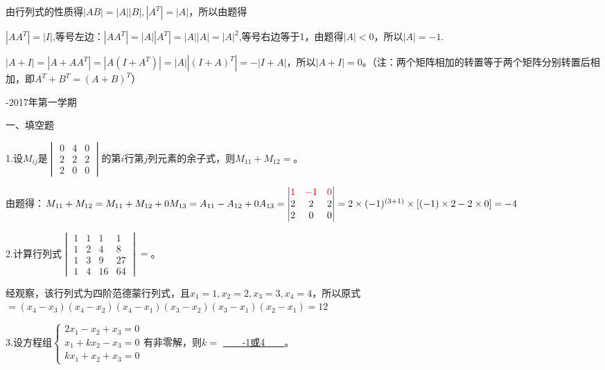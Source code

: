 \documentclass{article}
\begin{document}
\begin{zhengming}
由行列式的性质得$|AB|=|A||B|,|A^{T}|=|A|$，所以由题得

$|AA^{T}|=|I|$,等号左边：$|AA^{T}|=|A||A^{T}|=|A||A|=|A|^{2}$,等号右边等于1，由题得$|A|<0$，所以$|A|=-1$.

$|A+I|=|A+AA^{T}|=|A(I+A^{T})|=|A||(I+A)^{T}|=-|I+A|$，所以$|A+I|=0$。\textcolor[rgb]{1.00,0.00,0.00}{（注：两个矩阵相加的转置等于两个矩阵分别转置后相加，即$A^{T}+B^{T}=(A+B)^{T}$）}
\end{zhengming}
\newpage
\hphantom{~~}\hfill {-2017年第一学期} \hfill\hphantom{~~}

一、填空题

1.设$M_{ij}$是$
\begin{vmatrix}
  0 & 4 & 0 \\
  2 & 2 & 2\\
  2 & 0 & 0
\end{vmatrix}
$的第$i$行第$j$列元素的余子式，则$M_{11}+M_{12}=$\underline{\hphantom{~~~~~~~~~~}}。

\begin{jie}
由题得：$M_ {11}+M_{12}=M_ {11}+M_{12}+0M_{13}=A_{11}-A_{12}+0A_{13}=\begin{vmatrix}
  \textcolor[rgb]{1.00,0.00,0.00}{1} & \textcolor[rgb]{1.00,0.00,0.00}{-1} & \textcolor[rgb]{1.00,0.00,0.00}{0} \\
  2 & 2 & 2\\
  2 & 0 & 0
\end{vmatrix}=2\times(-1)^{(3+1)}\times[(-1)\times 2-2\times0]=-4$
\end{jie}

2.计算行列式$
\begin{vmatrix}
  1 & 1 & 1 & 1 \\
  1 & 2 & 4& 8 \\
  1 & 3 & 9& 27\\
   1 & 4 &16 &64
\end{vmatrix}
=$\underline{\hphantom{~~~~~~~~~~}}。

\begin{jie}
经观察，该行列式为四阶范德蒙行列式，且$x_{1}=1,x_{2}=2,x_{3}=3,x_{4}=4$，所以原式$=(x_{4}-x_{3})(x_{4}-x_{2})(x_{4}-x_{1})(x_{3}-x_{2})(x_{3}-x_{1})(x_{2}-x_{1})=12$
\end{jie}

3.设方程组$
\begin{cases}
 2x_{1}-x_{2}+x_{3}=0\\
 x_{1}+kx_{2}-x_{3}=0\\
 kx_{1}+x_{2}+x_{3}=0
\end{cases}
$有非零解，则$k=$
\underline{~~~~-1或4~~~~}。
\end{document}
